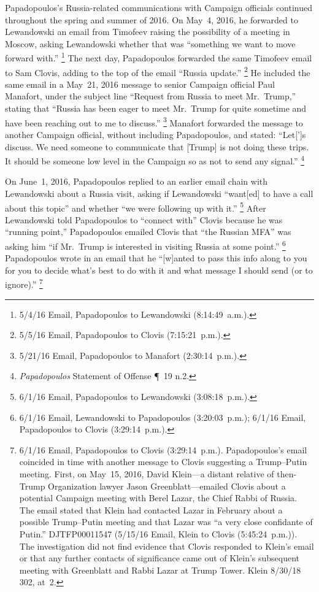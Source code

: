 Papadopoulos's Russia-related communications with Campaign officials continued throughout the spring and summer of 2016.
On May~4, 2016, he forwarded to Lewandowski an email from Timofeev raising the possibility of a meeting in Moscow, asking Lewandowski whether that was ``something we want to move forward with.''%
\footnote{5/4/16 Email, Papadopoulos to Lewandowski (8:14:49~a.m.).}
The next day, Papadopoulos forwarded the same Timofeev email to Sam Clovis, adding to the top of the email ``Russia update.''%
\footnote{5/5/16 Email, Papadopoulos to Clovis (7:15:21~p.m.).}
He included the same email in a May~21, 2016 message to senior Campaign official Paul Manafort, under the subject line ``Request from Russia to meet Mr.~Trump,'' stating that ``Russia has been eager to meet Mr.~Trump for quite sometime and have been reaching out to me to discuss.''%
\footnote{5/21/16 Email, Papadopoulos to Manafort (2:30:14~p.m.).}
Manafort forwarded the message to another Campaign official, without including Papadopoulos, and stated: ``Let[']s discuss.
We need someone to communicate that [Trump] is not doing these trips.
It should be someone low level in the Campaign so as not to send any signal.''%
\footnote{\textit{Papadopoulos} Statement of Offense \P~19 n.2.}

On June~1, 2016, Papadopoulos replied to an earlier email chain with Lewandowski about a Russia visit, asking if Lewandowski ``want[ed] to have a call about this topic'' and whether ``we were following up with it.''%
\footnote{6/1/16 Email, Papadopoulos to Lewandowski (3:08:18~p.m.).}
After Lewandowski told Papadopoulos to ``connect with'' Clovis because he was ``running point,'' Papadopoulos emailed Clovis that ``the Russian MFA'' was asking him ``if Mr.~Trump is interested in visiting Russia at some point.''%
\footnote{6/1/16 Email, Lewandowski to Papadopoulos (3:20:03~p.m.);
6/1/16 Email, Papadopoulos to Clovis (3:29:14~p.m.).}
Papadopoulos wrote in an email that he ``[w]anted to pass this info along to you for you to decide what's best to do with it and what message I should send (or to ignore).''%
\footnote{6/1/16 Email, Papadopoulos to Clovis (3:29:14~p.m.).
Papadopoulos's email coincided in time with another message to Clovis suggesting a Trump--Putin meeting.
First, on May~15, 2016, David Klein---a distant relative of then-Trump Organization lawyer Jason Greenblatt---emailed Clovis about a potential Campaign meeting with Berel Lazar, the Chief Rabbi of Russia.
The email stated that Klein had contacted Lazar in February about a possible Trump--Putin meeting and that Lazar was ``a very close confidante of Putin.''
DJTFP00011547 (5/15/16 Email, Klein to Clovis (5:45:24~p.m.)).
The investigation did not find evidence that Clovis responded to Klein's email or that any further contacts of significance came out of Klein's subsequent meeting with Greenblatt and Rabbi Lazar at Trump Tower.
Klein 8/30/18 302, at~2.}

